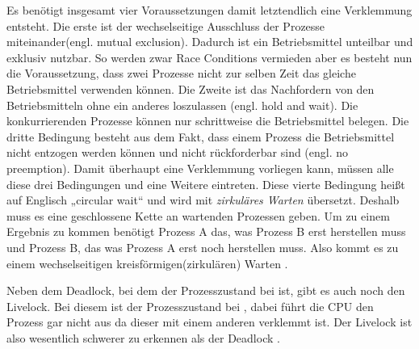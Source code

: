 Es benötigt insgesamt vier Voraussetzungen damit letztendlich eine Verklemmung entsteht. Die erste ist der wechselseitige Ausschluss der Prozesse miteinander(engl. mutual exclusion). Dadurch ist ein Betriebsmittel unteilbar und exklusiv nutzbar. So werden zwar Race Conditions vermieden aber es besteht nun die Voraussetzung, dass zwei Prozesse nicht zur selben Zeit das gleiche Betriebsmittel verwenden können. Die Zweite ist das Nachfordern von den Betriebsmitteln ohne ein anderes loszulassen (engl. hold and wait). Die konkurrierenden Prozesse können nur schrittweise die Betriebsmittel belegen. Die dritte Bedingung besteht aus dem Fakt, dass einem Prozess die Betriebsmittel nicht entzogen werden können und nicht rückforderbar sind (engl. no preemption). Damit überhaupt eine Verklemmung vorliegen kann, müssen alle diese drei Bedingungen und eine Weitere eintreten. Diese vierte Bedingung heißt auf Englisch „circular wait“ und wird mit \textit{zirkuläres Warten} übersetzt. Deshalb muss es eine geschlossene Kette an wartenden Prozessen geben. Um zu einem Ergebnis zu kommen benötigt Prozess A das, was Prozess B erst herstellen muss und Prozess B, das was Prozess A erst noch herstellen muss. Also kommt es zu einem wechselseitigen kreisförmigen(zirkulären) Warten \parencite[vgl.][S. 195f.]{baun2017}.

Neben dem Deadlock, bei dem der Prozesszustand bei  ist, gibt es auch noch den Livelock. Bei diesem ist der Prozesszustand bei , dabei führt die CPU den Prozess gar nicht aus da dieser mit einem anderen verklemmt ist. Der Livelock ist also wesentlich schwerer zu erkennen als der Deadlock \parencite[vgl.][S. 561 f.]{tanenbaum2016}.